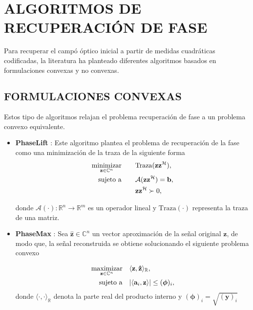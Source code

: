 \chapter{ALGORITMOS DE RECUPERACIÓN DE FASE}
Para recuperar el campó óptico inicial a partir de medidas cuadráticas codificadas, la literatura ha planteado diferentes algoritmos basados en formulaciones convexas y no convexas.

\section{FORMULACIONES CONVEXAS}

Estos tipo de algoritmos relajan el problema recuperación de fase a un problema convexo equivalente.

\begin{itemize}
    \item \textbf{PhaseLift }:
    Este algoritmo plantea el problema de recuperación de la fase como una minimización de la traza de la siguiente forma
    \begin{equation}
        \begin{aligned}
            \operatorname*{minimizar}_{\mathbf{z} \in \mathbb{C}^{n}} \quad & \quad \mathrm{Traza}(\mathbf{z}\mathbf{z}^{\mathcal{H}}), \\
            \operatorname*{sujeto \ a} \quad & \quad \mathcal{A}(\mathbf{z}\mathbf{z}^{\mathcal{H}}) = \mathbf{b}, \\
             &\quad  \mathbf{z}\mathbf{z}^{\mathcal{H}} \succ 0,
        \end{aligned}
    \end{equation}
    
    donde $\mathcal{A}( \cdot ): \mathbb{R}^{n} \rightarrow \mathbb{R}^{m}$ es un operador lineal y $\mathrm{Traza}(\cdot)$ representa la traza de una matriz.
    
    \item \textbf{PhaseMax} :
    Sea $\mathbf{\hat{z}} \in \mathbb{C}^{n}$ un vector aproximación de la señal original $\mathbf{z}$, de modo que, la señal reconstruida se obtiene solucionando el siguiente problema convexo
        
    \begin{equation}
        \begin{aligned}
            \operatorname*{maximizar}_{\mathbf{z}\in \mathbb{C}^n} \quad & \langle \mathbf{z}, \mathbf{\hat{z}} \rangle_{\mathbb{R}}, \\
            \operatorname*{sujeto \ a} \quad & \vert \langle \mathbf{a}_i,\mathbf{z} \rangle \vert \leq (\boldsymbol{\phi})_i,
        \end{aligned}
    \end{equation}
    donde $\langle \cdot, \cdot \rangle_{\mathbb{R}}$ denota la parte real del producto interno y $(\boldsymbol{\phi})_i = \sqrt{(\mathbf{y})_i}$
    
\end{itemize}

